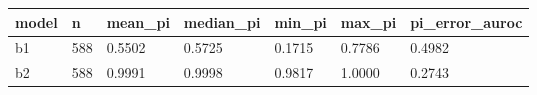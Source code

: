 \begin{tabular}{lllllll}
\hline
model & n & mean\_pi & median\_pi & min\_pi & max\_pi & pi\_error\_auroc \\
\hline
b1 & 588 & 0.5502 & 0.5725 & 0.1715 & 0.7786 & 0.4982 \\
b2 & 588 & 0.9991 & 0.9998 & 0.9817 & 1.0000 & 0.2743 \\
\hline
\end{tabular}
